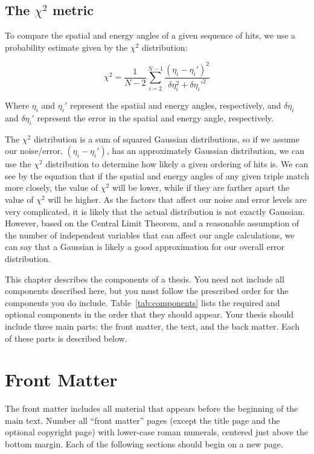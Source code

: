 \subsection*{The $\chi^2$ metric}
To compare the spatial and energy angles of a given sequence of hits, we use a probability estimate given by the $\chi^2$ distribution:

\begin{equation}
    \label{eq:chi2}\chi^2 = \frac{1}{N-2} \sum_{i=2}^{N-1} \frac{(\eta_i-\eta_i')^2}{\delta\eta_i^2+\delta\eta_i'^2}
\end{equation}

Where $\eta_i$ and $\eta_i'$ represent the spatial and energy angles, respectively, and $\delta\eta_i$ and $\delta\eta_i'$ represent the error in the spatial and energy angle, respectively.

The $\chi^2$ distribution is a sum of squared Gaussian distributions, so if we assume our noise/error, $(\eta_i-\eta_i')$, has an approximately Gaussian distribution, we can use the $\chi^2$ distribution to determine how likely a given ordering of hits is. We can see by the equation that if the spatial and energy angles of any given triple match more closely, the value of $\chi^2$ will be lower, while if they are farther apart the value of $\chi^2$ will be higher. As the factors that affect our noise and error levels are very complicated, it is likely that the actual distribution is not exactly Gaussian. However, based on the Central Limit Theorem, and a reasonable assumption of the number of independent variables that can affect our angle calculations, we can say that a Gaussian is likely a good approximation for our overall error distribution.

\iffalse

This chapter describes the components of a thesis.  You need not include all
components described here, but you must follow the prescribed order for the
components you do include. Table~\ref{tab:components} lists the required and
optional components in the order that they should appear.  Your thesis should
include three main parts: the front matter, the text, and the back matter.
Each of these parts is described below.

\section{Front Matter}

The front matter includes all material that appears before the beginning of the
main text.  Number all ``front matter'' pages (except the title page and the
optional copyright page) with lower-case roman numerals, centered just above
the bottom margin.  Each of the following sections should begin on a new page.

